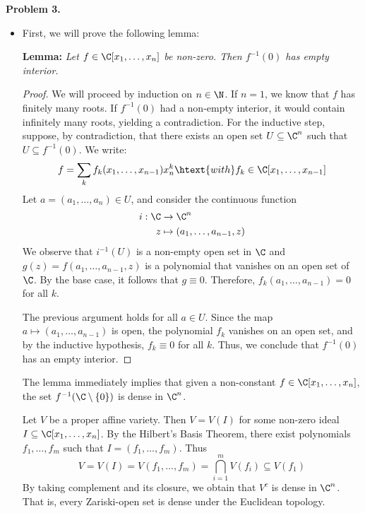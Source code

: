 \documentclass{article}
\begin{document}
\newpage
\noindent\textbf{Problem 3.}
\begin{itemize}
    \item[(a)] First, we will prove the following lemma:
    
    \vspace{1mm}
    \noindent\textbf{Lemma:} \emph{Let $f\in\C[x_{1},\dots,x_{n}]$ be non-zero. Then 
    $f^{-1}(0)$ has empty interior.}

    \begin{proof}
        We will proceed by induction on $n\in\N$. If $n=1$, we know that $f$ has finitely many 
        roots. If $f^{-1}(0)$ had a non-empty interior, it would contain infinitely many roots, 
        yielding a contradiction. For the inductive step, suppose, by contradiction, that there 
        exists an open set $U\subseteq\C^{n}$ such that $U\subseteq f^{-1}(0)$. We write:
        \begin{equation*}
            f=\sum_{k}f_{k}(x_{1},\dots,x_{n-1})x_{n}^{k}
            \htext{with} f_{k}\in\C[x_{1},\dots,x_{n-1}]
        \end{equation*}
        Let $a=(a_{1},\dots,a_{n})\in U$, and consider the continuous function
        \begin{align*}
            i:\C &\to \C^{n} \\
            z & \mapsto (a_{1},\dots,a_{n-1},z)
        \end{align*}
        We observe that $i^{-1}(U)$ is a non-empty open set in $\C$ and 
        $g(z)=f(a_{1},\dots,a_{n-1},z)$ is a polynomial that vanishes on an open set of $\C$. By 
        the base case, it follows that $g\equiv0$. Therefore, $f_{k}(a_{1},\dots,a_{n-1})=0$ for 
        all $k$.

        The previous argument holds for all $a\in U$. Since the map 
        $a\mapsto(a_{1},\dots,a_{n-1})$ is open, the polynomial $f_{k}$ vanishes on an open set,
        and by the inductive hypothesis, $f_{k}\equiv0$ for all $k$. Thus, we conclude that 
        $f^{-1}(0)$ has an empty interior.
    \end{proof}

    The lemma immediately implies that given a non-constant $f\in\C[x_{1},\dots,x_{n}]$, the set
    $f^{-1}(\C\setminus\{0\})$ is dense in $\C^{n}$.

    Let $V$ be a proper affine variety. Then $V=V(I)$ for some non-zero ideal 
    $I\subseteq\C[x_{1},\dots,x_{n}]$. By the Hilbert's Basis Theorem, there exist polynomials
    $f_{1},\dots,f_{m}$ such that $I=(f_{1},\dots,f_{m})$. Thus
    \begin{equation*}
        V=V(I)=V(f_{1},\dots,f_{m})=\bigcap_{i=1}^{m}V(f_{i})\subseteq V(f_{1})
    \end{equation*}
    By taking complement and its closure, we obtain that $V^{c}$ is dense in $\C^{n}$. That is, 
    every Zariski-open set is dense under the Euclidean topology.


\end{itemize}
\end{document}
